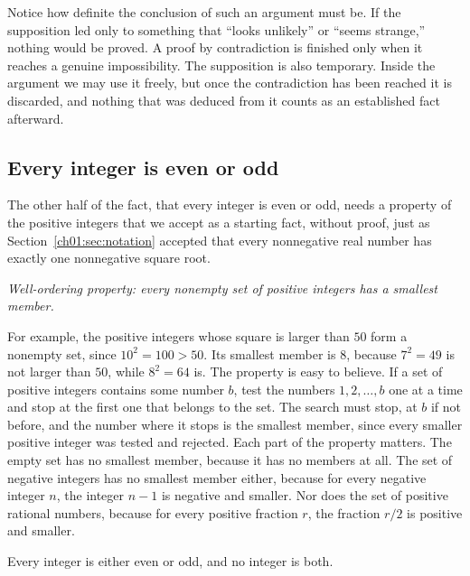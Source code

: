 Notice how definite the conclusion of such an argument must be. If the supposition led only to something that ``looks unlikely'' or ``seems strange,'' nothing would be proved. A proof by contradiction is finished only when it reaches a genuine impossibility. The supposition is also temporary. Inside the argument we may use it freely, but once the contradiction has been reached it is discarded, and nothing that was deduced from it counts as an established fact afterward.

\subsection*{Every integer is even or odd}
The other half of the fact, that every integer is even or odd, needs a property of the positive integers that we accept as a starting fact, without proof, just as Section~\ref{ch01:sec:notation} accepted that every nonnegative real number has exactly one nonnegative square root.

\begin{center}
\emph{Well-ordering property: every nonempty set of positive integers has a smallest member.}
\end{center}
For example, the positive integers whose square is larger than $50$ form a nonempty set, since $10^2=100>50$. Its smallest member is $8$, because $7^2=49$ is not larger than $50$, while $8^2=64$ is. The property is easy to believe. If a set of positive integers contains some number $b$, test the numbers $1,2,\ldots,b$ one at a time and stop at the first one that belongs to the set. The search must stop, at $b$ if not before, and the number where it stops is the smallest member, since every smaller positive integer was tested and rejected. Each part of the property matters. The empty set has no smallest member, because it has no members at all. The set of negative integers has no smallest member either, because for every negative integer $n$, the integer $n-1$ is negative and smaller. Nor does the set of positive rational numbers, because for every positive fraction $r$, the fraction $r/2$ is positive and smaller.

\par\noindent\begin{minipage}{\linewidth}
\begin{lemma}\label{ch04:lem:even-or-odd}
Every integer is either even or odd, and no integer is both.
\end{lemma}
\end{minipage}\par

